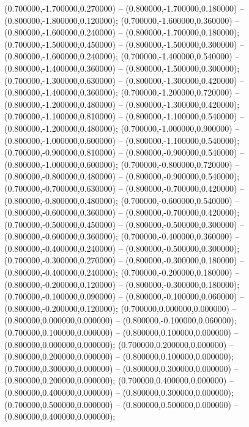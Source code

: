  (0.700000,-1.700000,0.270000) -- (0.800000,-1.700000,0.180000) -- (0.800000,-1.800000,0.120000);
 (0.700000,-1.600000,0.360000) -- (0.800000,-1.600000,0.240000) -- (0.800000,-1.700000,0.180000);
 (0.700000,-1.500000,0.450000) -- (0.800000,-1.500000,0.300000) -- (0.800000,-1.600000,0.240000);
 (0.700000,-1.400000,0.540000) -- (0.800000,-1.400000,0.360000) -- (0.800000,-1.500000,0.300000);
 (0.700000,-1.300000,0.630000) -- (0.800000,-1.300000,0.420000) -- (0.800000,-1.400000,0.360000);
 (0.700000,-1.200000,0.720000) -- (0.800000,-1.200000,0.480000) -- (0.800000,-1.300000,0.420000);
 (0.700000,-1.100000,0.810000) -- (0.800000,-1.100000,0.540000) -- (0.800000,-1.200000,0.480000);
 (0.700000,-1.000000,0.900000) -- (0.800000,-1.000000,0.600000) -- (0.800000,-1.100000,0.540000);
 (0.700000,-0.900000,0.810000) -- (0.800000,-0.900000,0.540000) -- (0.800000,-1.000000,0.600000);
 (0.700000,-0.800000,0.720000) -- (0.800000,-0.800000,0.480000) -- (0.800000,-0.900000,0.540000);
 (0.700000,-0.700000,0.630000) -- (0.800000,-0.700000,0.420000) -- (0.800000,-0.800000,0.480000);
 (0.700000,-0.600000,0.540000) -- (0.800000,-0.600000,0.360000) -- (0.800000,-0.700000,0.420000);
 (0.700000,-0.500000,0.450000) -- (0.800000,-0.500000,0.300000) -- (0.800000,-0.600000,0.360000);
 (0.700000,-0.400000,0.360000) -- (0.800000,-0.400000,0.240000) -- (0.800000,-0.500000,0.300000);
 (0.700000,-0.300000,0.270000) -- (0.800000,-0.300000,0.180000) -- (0.800000,-0.400000,0.240000);
 (0.700000,-0.200000,0.180000) -- (0.800000,-0.200000,0.120000) -- (0.800000,-0.300000,0.180000);
 (0.700000,-0.100000,0.090000) -- (0.800000,-0.100000,0.060000) -- (0.800000,-0.200000,0.120000);
 (0.700000,0.000000,0.000000) -- (0.800000,0.000000,0.000000) -- (0.800000,-0.100000,0.060000);
 (0.700000,0.100000,0.000000) -- (0.800000,0.100000,0.000000) -- (0.800000,0.000000,0.000000);
 (0.700000,0.200000,0.000000) -- (0.800000,0.200000,0.000000) -- (0.800000,0.100000,0.000000);
 (0.700000,0.300000,0.000000) -- (0.800000,0.300000,0.000000) -- (0.800000,0.200000,0.000000);
 (0.700000,0.400000,0.000000) -- (0.800000,0.400000,0.000000) -- (0.800000,0.300000,0.000000);
 (0.700000,0.500000,0.000000) -- (0.800000,0.500000,0.000000) -- (0.800000,0.400000,0.000000);

